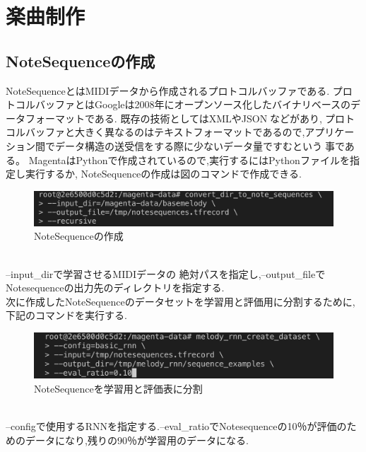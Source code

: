 \chapter{楽曲制作}
\section{NoteSequenceの作成}
NoteSequenceとはMIDIデータから作成されるプロトコルバッファである.
プロトコルバッファとはGoogleは2008年にオープンソース化したバイナリベースのデータフォーマットである.
既存の技術としてはXMLやJSONなどがあり,プロトコルバッファと大きく異なるのはテキストフォーマットであるので,アプリケーション間でデータ構造の送受信をする際に少ないデータ量ですむという事である。
MagentaはPythonで作成されているので,実行するにはPythonファイルを指定し実行するか,
NoteSequenceの作成は図のコマンドで作成できる.
\begin{figure}[!ht]
    \begin{screen}
    \begin{center}
        \includegraphics[scale=0.7, clip]{./img/Notesequence_make.png}
        \caption{NoteSequenceの作成}
        \label{fig:NoteSequenceの作成}
    \end{center}
    \end{screen}
\end{figure}\\
--input\_dirで学習させるMIDIデータの 絶対パスを指定し,--output\_fileでNotesequenceの出力先のディレクトリを指定する.\\
次に作成したNoteSequenceのデータセットを学習用と評価用に分割するために,下記のコマンドを実行する.
\begin{figure}[!ht]
    \begin{screen}
    \begin{center}
        \includegraphics[scale=0.7, clip]{./img/Notesequence_split.png}
        \caption{NoteSequenceを学習用と評価表に分割}
        \label{fig:NoteSequenceを学習用と評価表に分割}
    \end{center}
    \end{screen}
\end{figure}\\
--configで使用するRNNを指定する.--eval\_ratioでNotesequenceの10％が評価のためのデータになり,残りの90％が学習用のデータになる.\\
\newpage
